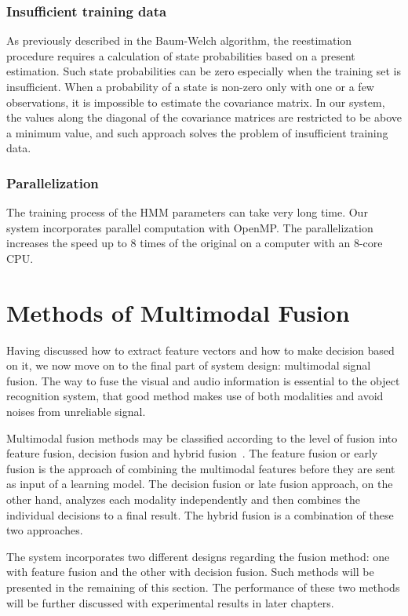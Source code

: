 \documentclass[12pt,final,twoside]{report}
\begin{document}
\subsubsection{Insufficient training data}

As previously described in the Baum-Welch algorithm, the reestimation procedure requires a calculation of state probabilities based on a present estimation. Such state probabilities can be zero especially when the training set is insufficient. When a probability of a state is non-zero only with one or a few observations, it is impossible to estimate the covariance matrix. In our system, the values along the diagonal of the covariance matrices are restricted to be above a minimum value, and such approach solves the problem of insufficient training data. 

\subsubsection{Parallelization}

The training process of the HMM parameters can take very long time. Our system incorporates parallel computation with OpenMP. The parallelization increases the speed up to 8 times of the original on a computer with an 8-core CPU.

\section{Methods of Multimodal Fusion}
Having discussed how to extract feature vectors and how to make decision based on it, we now move on to the final part of system design: multimodal signal fusion. The way to fuse the visual and audio information is essential to the object recognition system, that good method makes use of both modalities and avoid noises from unreliable signal.

Multimodal fusion methods may be classified according to the level of fusion into feature fusion, decision fusion and hybrid fusion~\cite{atrey_multimodal_2010}. The feature fusion or early fusion is the approach of combining the multimodal features before they are sent as input of a learning model. The decision fusion or late fusion approach, on the other hand, analyzes each modality independently and then combines the individual decisions to a final result. The hybrid fusion is a combination of these two approaches.

The system incorporates two different designs regarding the fusion method: one with feature fusion and the other with decision fusion. Such methods will be presented in the remaining of this section. The performance of these two methods will be further discussed with experimental results in later chapters.
\end{document}
